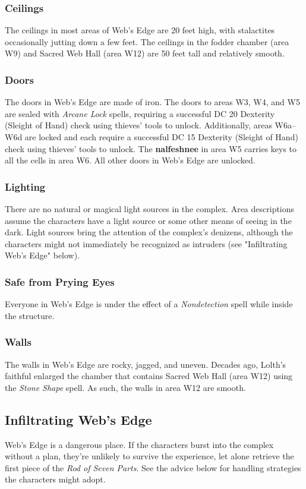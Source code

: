 \documentclass[10pt,a4paper,twoside,bg=print,twocolumn,openany,nodeprecatedcode]{dndbook}
\begin{document}
\subsubsection{Ceilings}
The ceilings in most areas of Web's Edge are 20 feet high, with stalactites occasionally jutting down a few feet. The ceilings in the fodder chamber (area W9) and Sacred Web Hall (area W12) are 50 feet tall and relatively smooth.

\subsubsection{Doors}
The doors in Web's Edge are made of iron. The doors to areas W3, W4, and W5 are sealed with \textit{Arcane Lock} spells, requiring a successful DC 20 Dexterity (Sleight of Hand) check using thieves' tools to unlock. Additionally, areas W6a–W6d are locked and each require a successful DC 15 Dexterity (Sleight of Hand) check using thieves' tools to unlock. The \textbf{nalfeshnee} in area W5 carries keys to all the cells in area W6. All other doors in Web's Edge are unlocked.

\subsubsection{Lighting}
There are no natural or magical light sources in the complex. Area descriptions assume the characters have a light source or some other means of seeing in the dark. Light sources bring the attention of the complex's denizens, although the characters might not immediately be recognized as intruders (see "Infiltrating Web's Edge" below).

\subsubsection{Safe from Prying Eyes}
Everyone in Web's Edge is under the effect of a \textit{Nondetection} spell while inside the structure.

\subsubsection{Walls}
The walls in Web's Edge are rocky, jagged, and uneven. Decades ago, Lolth's faithful enlarged the chamber that contains Sacred Web Hall (area W12) using the \textit{Stone Shape} spell. As such, the walls in area W12 are smooth.

\subsection{Infiltrating Web's Edge}
Web's Edge is a dangerous place. If the characters burst into the complex without a plan, they're unlikely to survive the experience, let alone retrieve the first piece of the \textit{Rod of Seven Parts}. See the advice below for handling strategies the characters might adopt.
\end{document}
